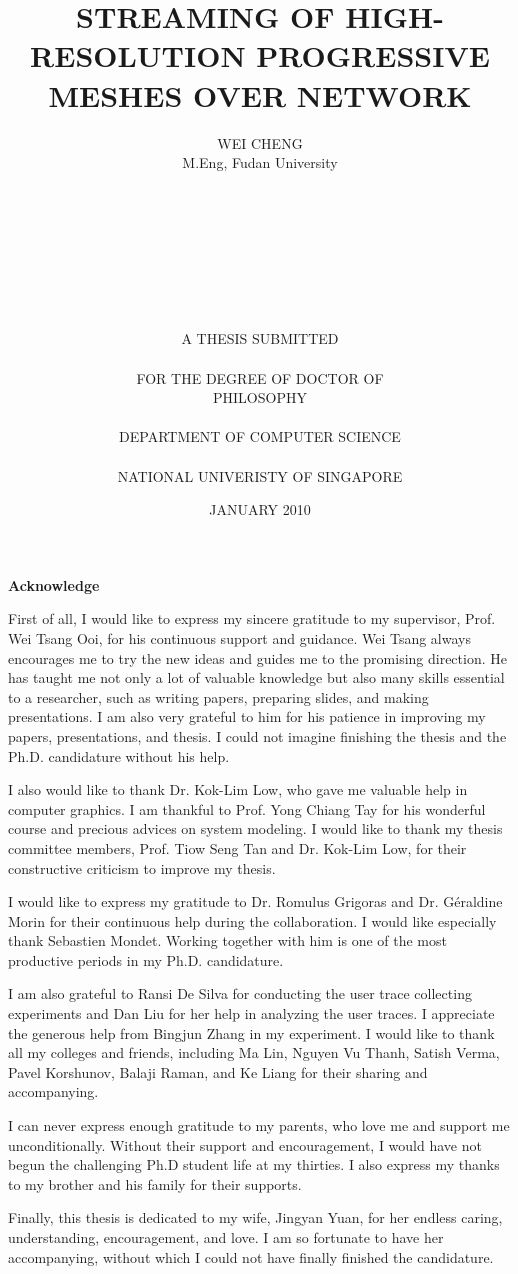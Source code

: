 \documentclass[11pt, a4paper]{report}
\date{JANUARY 2010}
\title{STREAMING OF HIGH-RESOLUTION PROGRESSIVE MESHES OVER NETWORK}
\author{WEI CHENG\\
M.Eng, Fudan University\\
\\
\\
\\
\\
\\
\\
\\
\\
A THESIS SUBMITTED\\
\\
FOR THE DEGREE OF DOCTOR OF\\
PHILOSOPHY\\
\\
DEPARTMENT OF COMPUTER SCIENCE\\
\\
NATIONAL UNIVERISTY OF SINGAPORE\\
}
\newcommand\acknowledgename{Acknowledge}
\newenvironment{acknowledge}%
    {\cleardoublepage \null \vfill
    \begin{center}%
         \bfseries \acknowledgename
    \end{center}}%
    {\vfill \null}
\begin{document}
\maketitle
\pagestyle{empty}
\cleardoublepage
\pagestyle{plain}
\doublespacing
{}
\begin{acknowledge}
    First of all, I would like to express my sincere gratitude to my supervisor, Prof. Wei Tsang Ooi, for his continuous support and guidance. 
    Wei Tsang always encourages me to try the new ideas and guides me to the promising direction. He has taught me not only a lot of valuable knowledge
    but also many skills essential to a researcher, such as writing papers, preparing slides, and making presentations. 
    I am also very grateful to him for his patience in improving my papers, presentations, and thesis. 
    I could not imagine finishing the thesis and the Ph.D. candidature without his help.

    I also would like to thank Dr. Kok-Lim Low, who gave me valuable help in computer graphics. I am thankful to Prof. Yong Chiang Tay for his
    wonderful course and precious advices on system modeling. I would like to thank my thesis committee members, Prof. Tiow Seng Tan and Dr. Kok-Lim Low, 
    for their constructive criticism to improve my thesis.

    I would like to express my gratitude to Dr. Romulus Grigoras and Dr. G\'{e}raldine Morin for their continuous help during the collaboration. I would
    like especially thank Sebastien Mondet. Working together with him is one of the most productive periods in my Ph.D. candidature. 

    I am also grateful to Ransi De Silva for conducting the user trace collecting experiments and Dan Liu for her help in analyzing the user traces.
    I appreciate the generous help from Bingjun Zhang in my experiment. 
    I would like to thank all my colleges and friends, including Ma Lin, Nguyen Vu Thanh, Satish Verma, Pavel Korshunov, Balaji Raman, and Ke Liang for their
    sharing and accompanying.

    I can never express enough gratitude to my parents, who love me and support me unconditionally. Without their support and encouragement, I would have not
    begun the challenging Ph.D student life at my thirties. I also express my thanks to my brother and his family for their supports. 
    
    Finally, this thesis is dedicated to my wife, Jingyan Yuan, for her endless caring, understanding, encouragement, and love. I am so fortunate to have her
    accompanying, without which I could not have finally finished the candidature.

\end{acknowledge}
\tableofcontents
   
\listoffigures
\listoftables







\appendix
\end{document}
